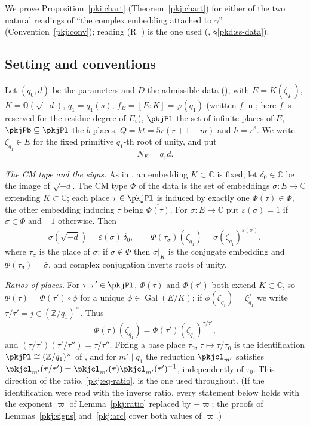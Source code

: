 \documentclass[10pt]{amsart}
\theoremstyle{definition}
\theoremstyle{remark}
\newcommand{\C}{\mathbb C}
\newcommand{\Z}{\mathbb Z}
\newcommand{\Q}{\mathbb Q}
\begin{document}
We prove Proposition~\ref{pki:chart} (Theorem~\ref{pkj:chart}) for either of
the two natural readings of ``the complex embedding attached to $\gamma$'' (Convention~\ref{pkj:conv});
reading (R$^-$) is the one used ({\cite[\S5.1]{P55}}, \S\ref{pkd:ss-data}).

\subsection{Setting and conventions}\label{pkj:ss-setting}

Let $(q_0,d)$ be the parameters and $D$ the admissible data ({\cite[Definition~13.3]{P46}}), with
$E=K(\zeta_{q_1})$, $K=\Q(\sqrt{-d})$, $q_1=q_1(s)$, $f_E=[E:K]=\varphi(q_1)$ (written $f$ in
{\cite[\S13]{P46}}; here $f$ is reserved for the residue degree of $E_v$), $\pkjPl$ the set of
infinite places of $E$, $\pkjPb\subseteq\pkjPl$ the $b$-places, $Q=kt=5r(r+1-m)$ and $h=r^8$. We
write $\zeta_{q_1}\in E$ for the fixed primitive $q_1$-th root of unity, and put
\[
N_E=q_1d .
\]

\emph{The CM type and the signs.} As in {\cite[\S13.1]{P46}}, an embedding $K\subset\C$ is fixed;
let $\delta_0\in\C$ be the image of $\sqrt{-d}$. The CM type $\Phi$ of the data is the set of
embeddings $\sigma\colon E\to\C$ extending $K\subset\C$; each place $\tau\in\pkjPl$ is induced by
exactly one $\Phi(\tau)\in\Phi$, the other embedding inducing $\tau$ being $\overline{\Phi(\tau)}$.
For $\sigma\colon E\to\C$ put $\varepsilon(\sigma)=1$ if $\sigma\in\Phi$ and $-1$ otherwise. Then
\begin{equation}\label{pkj:eq-sign}
\sigma(\sqrt{-d})=\varepsilon(\sigma)\,\delta_0,\qquad
\Phi(\tau_\sigma)(\zeta_{q_1})=\sigma(\zeta_{q_1})^{\varepsilon(\sigma)},
\end{equation}
where $\tau_\sigma$ is the place of $\sigma$: if $\sigma\notin\Phi$ then $\sigma|_K$ is the conjugate
embedding and $\Phi(\tau_\sigma)=\bar\sigma$, and complex conjugation inverts roots of unity.

\emph{Ratios of places.} For $\tau,\tau'\in\pkjPl$, $\Phi(\tau)$ and $\Phi(\tau')$ both extend
$K\subset\C$, so $\Phi(\tau)=\Phi(\tau')\circ\phi$ for a unique $\phi\in\operatorname{Gal}(E/K)$; if
$\phi(\zeta_{q_1})=\zeta_{q_1}^{j}$ we write $\tau/\tau'=j\in(\Z/q_1)^\times$. Thus
\begin{equation}\label{pkj:eq-ratio}
\Phi(\tau)(\zeta_{q_1})=\Phi(\tau')(\zeta_{q_1})^{\tau/\tau'},
\end{equation}
and $(\tau/\tau')(\tau'/\tau'')=\tau/\tau''$. Fixing a base place $\tau_0$, $\tau\mapsto\tau/\tau_0$ is
the identification $\pkjPl\cong(\Z/q_1)^\times$ of {\cite[\S13.1]{P46}}, and for $m'\mid q_1$ the
reduction $\pkjcl_{m'}$ satisfies $\pkjcl_{m'}(\tau/\tau')=\pkjcl_{m'}(\tau)\pkjcl_{m'}(\tau')^{-1}$,
independently of $\tau_0$. This direction of the ratio, \eqref{pkj:eq-ratio}, is the one used
throughout. (If the identification were read with the inverse ratio, every statement
below holds with the exponent $\varpi$ of Lemma~\ref{pkj:ratio} replaced by $-\varpi$; the proofs of
Lemmas~\ref{pkj:signs} and~\ref{pkj:arc} cover both values of $\varpi$.)
\end{document}
